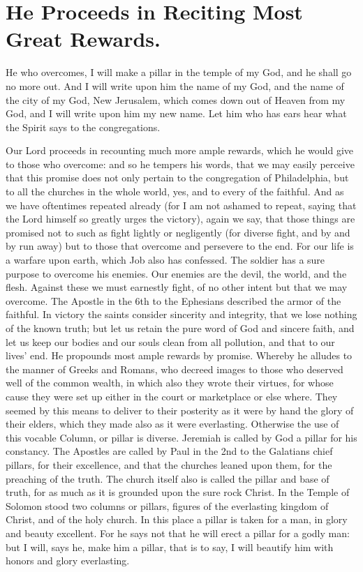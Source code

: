\chapter[Sermon 19. He Proceeds in Reciting Most Great Rewards.]{He Proceeds in Reciting Most Great Rewards.}
\label{sermon:019}

He who overcomes, I will make a pillar in the temple of my God, and he shall go no more out. And I will write upon him the name of my God, and the name of the city of my God, New Jerusalem, which comes down out of Heaven from my God, and I will write upon him my new name. Let him who has ears hear what the Spirit says to the congregations.

Our Lord proceeds in recounting much more ample rewards, which he would give to those who overcome: and so he tempers his words, that we may easily perceive that this promise does not only pertain to the congregation of Philadelphia, but to all the churches in the whole world, yes, and to every of the faithful. And as we have oftentimes repeated already (for I am not ashamed to repeat, saying that the Lord himself so greatly urges the victory), again we say, that those things are promised not to such as fight lightly or negligently (for diverse fight, and by and by run away) but to those that overcome and persevere to the end. For our life is a warfare upon earth, which Job also has confessed. The soldier has a sure purpose to overcome his enemies. Our enemies are the devil, the world, and the flesh. Against these we must earnestly fight, of no other intent but that we may overcome. The Apostle in the 6th to the Ephesians described the armor of the faithful. In victory the saints consider sincerity and integrity, that we lose nothing of the known truth; but let us retain the pure word of God and sincere faith, and let us keep our bodies and our souls clean from all pollution, and that to our lives’ end. He propounds most ample rewards by promise. Whereby he alludes to the manner of Greeks and Romans, who decreed images to those who deserved well of the common wealth, in which also they wrote their virtues, for whose cause they were set up either in the court or marketplace or else where. They seemed by this means to deliver to their posterity as it were by hand the glory of their elders, which they made also as it were everlasting. Otherwise the use of this vocable Column, or pillar is diverse. Jeremiah is called by God a pillar for his constancy. The Apostles are called by Paul in the 2nd to the Galatians chief pillars, for their excellence, and that the churches leaned upon them, for the preaching of the truth. The church itself also is called the pillar and base of truth, for as much as it is grounded upon the sure rock Christ. In the Temple of Solomon stood two columns or pillars, figures of the everlasting kingdom of Christ, and of the holy church. In this place a pillar is taken for a man, in glory and beauty excellent. For he says not that he will erect a pillar for a godly man: but I will, says he, make him a pillar, that is to say, I will beautify him with honors and glory everlasting.


